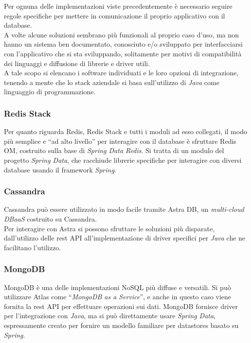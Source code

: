 \noindent Per ognuna delle implementazioni viste precedentemente è necessario seguire regole specifiche per mettere in comunicazione il proprio applicativo con il database.\\
A volte alcune soluzioni sembrano più funzionali al proprio caso d'uso, ma non hanno un sistema ben documentato, conosciuto e/o sviluppato per interfacciarsi con l'applicativo che si sta sviluppando, solitamente per motivi di compatibilità dei linguaggi e diffusione di librerie e driver utili.\\
A tale scopo si elencano i software individuati e le loro opzioni di integrazione, tenendo a mente che lo stack aziendale si basa sull'utilizzo di \textit{Java} come linguaggio di programmazione.

\subsubsection{Redis Stack}
Per quanto riguarda Redis, Redis Stack e tutti i moduli ad esso collegati, il modo più semplice e ``ad alto livello'' per interagire con il database è sfruttare Redis OM, costruito sulla base di \textit{Spring Data Redis}. Si tratta di un modulo del progetto \textit{Spring Data}, che racchiude librerie specifiche per interagire con diversi database usando il framework \textit{Spring}.

\subsubsection{Cassandra}
Cassandra può essere utilizzato in modo facile tramite Astra DB, un \textit{multi-cloud \gls{DBaaS}} costruito su Cassandra.\\
Per interagire con Astra si possono sfruttare le soluzioni più disparate, dall'utilizzo delle \gls{rest API} all'implementazione di driver specifici per \textit{Java} che ne facilitano l'utilizzo.

\subsubsection{MongoDB}
MongoDB è una delle implementazioni NoSQL più diffuse e versatili. Si può utilizzare Atlas come ``\textit{MongoDB as a Service}'', e anche in questo caso viene fornita la \gls{rest API} per effettuare operazioni sui dati. MongoDB fornisce driver per l'integrazione con \textit{Java}, ma si può direttamente usare \textit{Spring Data}, espressamente creato per fornire un modello familiare per datastores basato su \textit{Spring}.

